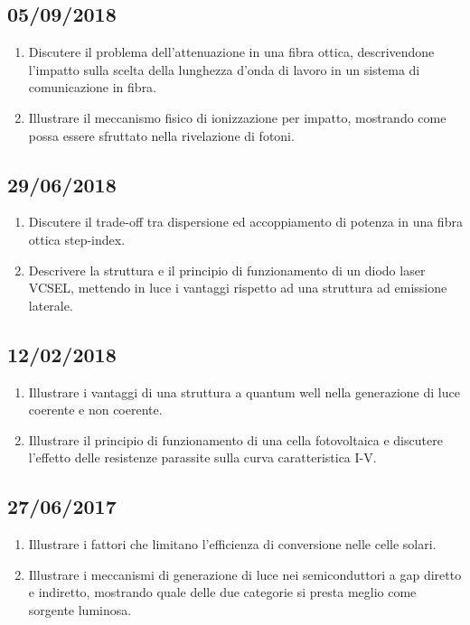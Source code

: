 \documentclass{article}
\begin{document}
\subsection{05/09/2018}
\begin{enumerate}
  \item Discutere il problema dell’attenuazione in una fibra ottica, descrivendone l’impatto sulla scelta della lunghezza
        d’onda di lavoro in un sistema di comunicazione in fibra.
  \item Illustrare il meccanismo fisico di ionizzazione per impatto, mostrando come possa essere sfruttato nella
        rivelazione di fotoni.
\end{enumerate}

\subsection{29/06/2018}
\begin{enumerate}
  \item Discutere il trade-off tra dispersione ed accoppiamento di potenza in una fibra ottica step-index.
  \item Descrivere la struttura e il principio di funzionamento di un diodo laser VCSEL, mettendo in luce i vantaggi
        rispetto ad una struttura ad emissione laterale.
\end{enumerate}

\subsection{12/02/2018}
\begin{enumerate}
  \item Illustrare i vantaggi di una struttura a quantum well nella generazione di luce coerente e non coerente.
  \item Illustrare il principio di funzionamento di una cella fotovoltaica e discutere l’effetto delle resistenze parassite sulla
        curva caratteristica I-V.
\end{enumerate}

\subsection{27/06/2017}
\begin{enumerate}
  \item Illustrare i fattori che limitano l’efficienza di conversione nelle celle solari.
  \item Illustrare i meccanismi di generazione di luce nei semiconduttori a gap diretto e indiretto, mostrando quale delle
        due categorie si presta meglio come sorgente luminosa.
\end{enumerate}
\end{document}
